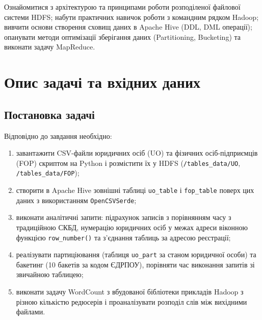 \documentclass{iasa-lab}
\begin{document}
\maketitle

\tableofcontents
\clearpage


Ознайомитися з архітектурою та принципами роботи розподіленої файлової системи HDFS; набути практичних навичок роботи з командним рядком Hadoop; вивчити основи створення сховищ даних в Apache Hive (DDL, DML операції); опанувати методи оптимізації зберігання даних (Partitioning, Bucketing) та виконати задачу MapReduce.

\section{Опис задачі та вхідних даних}

\subsection{Постановка задачі}

Відповідно до завдання необхідно:
\begin{enumerate}
  \item завантажити CSV-файли юридичних осіб (UO) та фізичних осіб-підприємців (FOP) скриптом на Python і розмістити їх у HDFS (\texttt{/tables\_data/UO}, \texttt{/tables\_data/FOP});
  \item створити в Apache Hive зовнішні таблиці \texttt{uo\_table} і \texttt{fop\_table} поверх цих даних з використанням \texttt{OpenCSVSerde};
  \item виконати аналітичні запити: підрахунок записів з порівнянням часу з традиційною СКБД, нумерацію юридичних осіб у межах адреси віконною функцією \texttt{row\_number()} та з'єднання таблиць за адресою реєстрації;
  \item реалізувати партиціювання (таблиця \texttt{uo\_part} за станом юридичної особи) та бакетинг (10 бакетів за кодом ЄДРПОУ), порівняти час виконання запитів зі звичайною таблицею;
  \item виконати задачу WordCount з вбудованої бібліотеки прикладів Hadoop з різною кількістю редюсерів і проаналізувати розподіл слів між вихідними файлами.
\end{enumerate}
\end{document}
